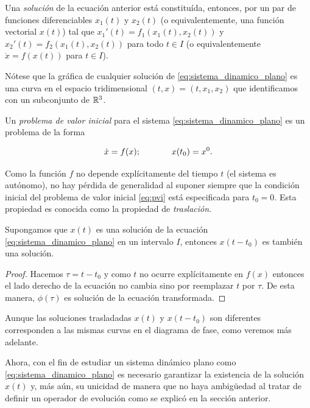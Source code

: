 Una \emph{solución} de la ecuación anterior está constituída, entonces, por un par de funciones diferenciables $x_1(t)$ y $x_2(t)$ (o equivalentemente, una función vectorial $x(t)$) tal que $x_1'(t) = f_1(x_1(t), x_2(t))$ y $x_2'(t) = f_2(x_1(t), x_2(t))$ para todo $t \in I$ (o equivalentemente $\dot{x} = f(x(t))$ para $t \in I$).

Nótese que la gráfica de cualquier solución de \ref{eq:sistema_dinamico_plano} es una curva en el espacio tridimensional $(t,x)=(t,x_1,x_2)$ que identificamos con un subconjunto de ${\mathbb{R}}^3$.

\begin{definition}\label{def:pvi}
Un \emph{problema de valor inicial} para el sistema \ref{eq:sistema_dinamico_plano} es un problema de la forma

\begin{equation} \label{eq:pvi}
 \dot{x} = f(x); \hspace{0.5in} x(t_0) = x^0.
\end{equation}

\end{definition}

Como la función $f$ no depende explícitamente del tiempo $t$ (el sistema es autónomo), no hay pérdida de generalidad al suponer siempre que la condición inicial del problema de valor inicial \ref{eq:pvi} está especificada para $t_0 = 0$. Esta propiedad es conocida como la propiedad de \emph{traslación}.

\begin{lemma} Supongamos que $x(t)$ es una solución de la ecuación \ref{eq:sistema_dinamico_plano} en un intervalo $I$, entonces $x(t-t_0)$ es también una solución.
\begin{proof}Hacemos $\tau = t - t_0$ y como $t$ no ocurre explícitamente en $f(x)$ entonces el lado derecho de la ecuación no cambia sino por reemplazar $t$ por $\tau$. De esta manera, $\phi(\tau)$ es solución de la ecuación transformada.
\end{proof}
\end{lemma}

Aunque las soluciones trasladadas $x(t)$ y $x(t-t_0)$ son diferentes corresponden a las mismas curvas en el diagrama de fase, como veremos más adelante.

Ahora, con el fin de estudiar un sistema dinámico plano como \ref{eq:sistema_dinamico_plano} es necesario garantizar la existencia de la solución $x(t)$ y, más aún, su unicidad de manera que no haya ambigüedad al tratar de definir un operador de evolución como se explicó en la sección anterior.

